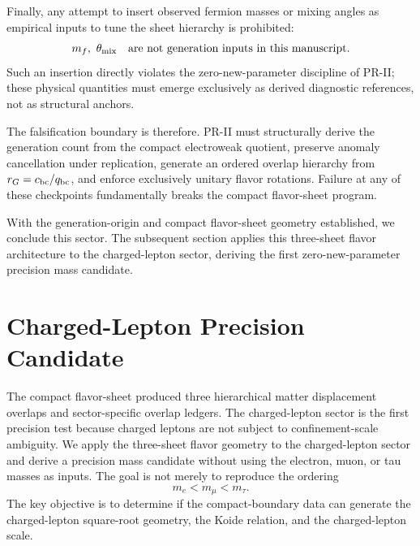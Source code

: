 \documentclass[11pt]{article}
\begin{document}
Finally, any attempt to insert observed fermion masses or mixing angles as empirical inputs to tune the sheet hierarchy is prohibited:
\begin{equation}
m_f,\ \theta_{\rm mix}
\quad
\text{are not generation inputs in this manuscript}.
\end{equation}
Such an insertion directly violates the zero-new-parameter discipline of PR-II; these physical quantities must emerge exclusively as derived diagnostic references, not as structural anchors.

The falsification boundary is therefore. PR-II must structurally derive the generation count from the compact electroweak quotient, preserve anomaly cancellation under replication, generate an ordered overlap hierarchy from \(r_G=c_{\rm bc}/q_{\rm bc}\), and enforce exclusively unitary flavor rotations. Failure at any of these checkpoints fundamentally breaks the compact flavor-sheet program.

With the generation-origin and compact flavor-sheet geometry established, we conclude this sector. The subsequent section applies this three-sheet flavor architecture to the charged-lepton sector, deriving the first zero-new-parameter precision mass candidate.

\section{Charged-Lepton Precision Candidate}
\label{sec:pr2_charged_lepton_precision_candidate}

The compact flavor-sheet produced three hierarchical matter displacement overlaps and sector-specific overlap ledgers. 
The charged-lepton sector is the first precision test because charged leptons are not subject to confinement-scale ambiguity. We apply the three-sheet flavor geometry to the charged-lepton sector and derive a precision mass candidate without using the electron, muon, or tau masses as inputs. The goal is not merely to reproduce the ordering
\begin{equation}
m_e<m_\mu<m_\tau.
\end{equation}
The key objective is to determine if the compact-boundary data can generate the charged-lepton square-root geometry, the Koide relation, and the charged-lepton scale.
\end{document}
